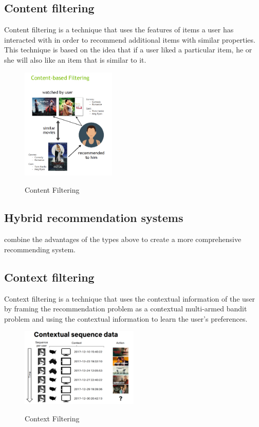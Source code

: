 \subsection{Content filtering}\label{subsec:content-filtering}
Content filtering is a technique that uses the features of items a user has interacted with in order to recommend additional items with similar properties. This technique is based on the idea that if a user liked a particular item, he or she will also like an item that is similar to it. 
\begin{figure}[H]
    \centering
    \includegraphics[width=0.4\textwidth]{assets/content_based_filtering.png}
    \caption{Content Filtering}
    \label{fig:content-filtering}
    \cite{NvidiaRecSys}
\end{figure}

\subsection{Hybrid recommendation systems}\label{subsec:hybrid-recommendation-systems}
combine the advantages of the types above to create a more comprehensive recommending system.

\subsection{Context filtering}\label{sec:context-filtering}
Context filtering is a technique that uses the contextual information of the user by framing the recommendation problem as a contextual multi-armed bandit problem and using the contextual information to learn the user's preferences.
\begin{figure}
    \centering
    \includegraphics[width=0.5\textwidth]{assets/contextual-sequence-prediction.png}
    \caption{Context Filtering}
    \label{fig:costextual-filtering}
    \cite{NvidiaRecSys}
\end{figure}